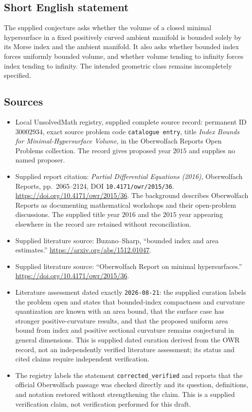 \documentclass[11pt]{article}
\begin{document}
\subsection{Short English statement}
The supplied conjecture asks whether the volume of a closed minimal hypersurface in a fixed positively curved ambient manifold is bounded solely by its Morse index and the ambient manifold. It also asks whether bounded index forces uniformly bounded volume, and whether volume tending to infinity forces index tending to infinity. The intended geometric class remains incompletely specified.
\subsection{Sources}
\begin{itemize}
\item Local UnsolvedMath registry, supplied complete source record: permanent ID \(30002934\), exact source problem code \texttt{catalogue entry}, title \emph{Index Bounds for Minimal-Hypersurface Volume}, in the Oberwolfach Reports Open Problems collection. The record gives proposed year \(2015\) and supplies no named proposer.
\item Supplied report citation: \emph{Partial Differential Equations (2016)}, Oberwolfach Reports, pp.~2065--2124, DOI \texttt{10.4171/owr/2015/36}. \url{https://doi.org/10.4171/owr/2015/36}. The background describes Oberwolfach Reports as documenting mathematical workshops and their open-problem discussions. The supplied title year \(2016\) and the \(2015\) year appearing elsewhere in the record are retained without reconciliation.
\item Supplied literature source: Buzano--Sharp, ``bounded index and area estimates.'' \url{https://arxiv.org/abs/1512.01047}.
\item Supplied literature source: ``Oberwolfach Report on minimal hypersurfaces.'' \url{https://doi.org/10.4171/owr/2015/36}.
\item Literature assessment dated exactly \texttt{2026-08-21}: the supplied curation labels the problem open and states that bounded-index compactness and curvature quantization are known with an area bound, that the surface case has stronger positive-curvature results, and that the proposed uniform area bound from index and positive sectional curvature remains conjectural in general dimensions. This is supplied dated curation derived from the OWR record, not an independently verified literature assessment; its status and cited claims require independent verification.
\item The registry labels the statement \texttt{corrected\_verified} and reports that the official Oberwolfach passage was checked directly and its question, definitions, and notation restored without strengthening the claim. This is a supplied verification claim, not verification performed for this draft.
\end{itemize}
\end{document}

